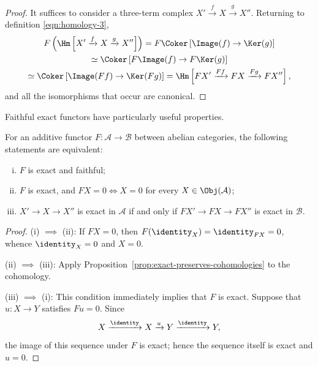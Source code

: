 \begin{proof}
It suffices to consider a three-term complex
$X'\xrightarrow{f}X\xrightarrow{g}X''$. Returning to definition
\eqref{eqn:homology-3},
\begin{multline*}
	F\left(\Hm\left[X'\xrightarrow{f}X\xrightarrow{g}X''\right]\right)
	=F\Coker\left[\Image(f)\to\Ker(g)\right]\\
	\simeq\Coker\left[F\Image(f)\to F\Ker(g)\right]\\
	\simeq\Coker\left[\Image(Ff)\to\Ker(Fg)\right]
	=\Hm\left[FX'\xrightarrow{Ff}FX\xrightarrow{Fg}FX''\right],
\end{multline*}
and all the isomorphisms that occur are canonical.
\end{proof}

Faithful exact functors have particularly useful properties.

\begin{proposition}\label{prop:faithful-exact}
For an additive functor $F:\mathcal{A}\to\mathcal{B}$ between abelian
categories, the following statements are equivalent:
\begin{enumerate}[(i)]
	\item $F$ is exact and faithful;
	\item $F$ is exact, and $FX=0\iff X=0$ for every
	$X\in\Obj(\mathcal{A})$;
	\item $X'\to X\to X''$ is exact in $\mathcal{A}$ if and only if
	$FX'\to FX\to FX''$ is exact in $\mathcal{B}$.
\end{enumerate}
\end{proposition}

\begin{proof}
(i) $\implies$ (ii): If $FX=0$, then
$F(\identity_X)=\identity_{FX}=0$, whence $\identity_X=0$ and $X=0$.

(ii) $\implies$ (iii): Apply
Proposition~\ref{prop:exact-preserves-cohomologies} to the cohomology.

(iii) $\implies$ (i): This condition immediately implies that $F$ is exact.
Suppose that $u:X\to Y$ satisfies $Fu=0$. Since
\[X\xrightarrow{\identity}X\xrightarrow{u}Y\xrightarrow{\identity}Y,\]
the image of this sequence under $F$ is exact; hence the sequence itself is
exact and $u=0$.
\end{proof}

